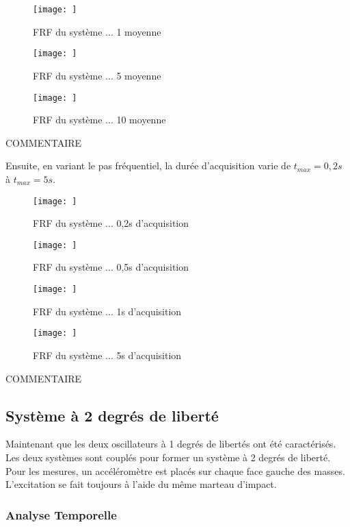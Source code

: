 \begin{figure}
    \centering
    \texttt{[image: ]}
    \caption{FRF du système ... 1 moyenne}
    \label{fig:FRF_s..._1moy}
\end{figure}
\begin{figure}
    \centering
    \texttt{[image: ]}
    \caption{FRF du système ... 5 moyenne}
    \label{fig:FRF_s..._1moy}
\end{figure}
\begin{figure}
    \centering
    \texttt{[image: ]}
    \caption{FRF du système ... 10 moyenne}
    \label{fig:FRF_s..._1moy}
\end{figure}

COMMENTAIRE

Ensuite, en variant le pas fréquentiel, la durée d'acquisition varie de $t_{max}=0,2s$ à $t_{max}=5s$.

\begin{figure}
    \centering
    \texttt{[image: ]}
    \caption{FRF du système ... 0,2s d'acquisition}
    \label{fig:FRF_s..._0,2s}
\end{figure}
\begin{figure}
    \centering
    \texttt{[image: ]}
    \caption{FRF du système ... 0,5s d'acquisition}
    \label{fig:FRF_s..._0,5s}
\end{figure}
\begin{figure}
    \centering
    \texttt{[image: ]}
    \caption{FRF du système ... 1s d'acquisition}
    \label{fig:FRF_s..._1s}
\end{figure}
\begin{figure}
    \centering
    \texttt{[image: ]}
    \caption{FRF du système ... 5s d'acquisition}
    \label{fig:FRF_s..._5s}
\end{figure}

COMMENTAIRE
\newpage
\subsection{Système à 2 degrés de liberté}
Maintenant que les deux oscillateurs à 1 degrés de libertés ont été caractérisés. Les deux systèmes sont couplés pour former un système à 2 degrés de liberté. Pour les mesures, un accéléromètre est placés sur chaque face gauche des masses. L'excitation se fait toujours à l'aide du même marteau d'impact.

\subsubsection{Analyse Temporelle}


